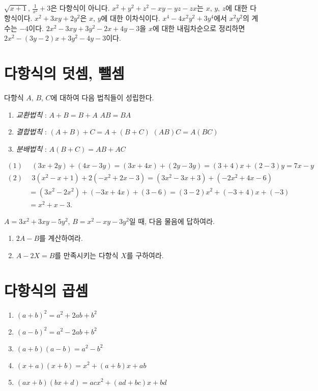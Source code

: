 \documentclass{oblivoir}
\begin{document}
%
\vspace{-20pt}
\tabd
{\(\sqrt{x+1}\), \(\frac1{x^2}+3\)은 다항식이 아니다.}
{\(x^2+y^2+z^2-xy-yz-zx\)는 \(x\), \(y\), \(z\)에 대한 다항식이다.}
{\(x^2+3xy+2y^2\)은 \(x\), \(y\)에 대한 이차식이다.}
{\(x^4-4x^2y^2+3y^4\)에서 \(x^2y^2\)의 계수는 \(-4\)이다.}
{\(2x^2-3xy+3y^2-2x+4y-3\)을 \(x\)에 대한 내림차순으로 정리하면\\ \(2x^2-(3y-2)x+3y^2-4y-3\)이다.}

\section{다항식의 덧셈, 뺄셈}

다항식 \(A\), \(B\), \(C\)에 대하여 다음 법칙들이 성립한다.
\begin{mdframed}
%
\begin{enumerate}
\item
\emph{교환법칙} : \(A+B=B+A\)			\(AB=BA\)
\item
\emph{결합법칙} : \((A+B)+C=A+(B+C)\)	\((AB)C=A(BC)\)
\item
\emph{분배법칙} : \(A(B+C)=AB+AC\)		
\end{enumerate}
\end{mdframed}

%
\exam{}
\vspace{-25pt}
\begin{align*}
(1)&\:\:
(3x+2y)+(4x-3y)
=(3x+4x)+(2y-3y)
=(3+4)x+(2-3)y=7x-y\\
(2)&\:\:
3(x^2-x+1)+2(-x^2+2x-3)
=(3x^2-3x+3)+(-2x^2+4x-6)\\
&=(3x^2-2x^2)+(-3x+4x)+(3-6)
=(3-2)x^2+(-3+4)x+(-3)\\
&=x^2+x-3.
\end{align*}

%
\prob{}
\(A=3x^2+3xy-5y^2\), \(B=x^2-xy-3y^2\)일 때, 다음 물음에 답하여라.
\begin{enumerate}[(1)]
\item
\(2A-B\)를 계산하여라.
\item
\(A-2X=B\)를 만족시키는 다항식 \(X\)를 구하여라.
\end{enumerate}

\section{다항식의 곱셈}

%
\begin{mdframed}
\begin{enumerate}[(1)]
\item
\((a+b)^2=a^2+2ab+b^2\)
\item
\((a-b)^2=a^2-2ab+b^2\)
\item
\((a+b)(a-b)=a^2-b^2\)
\item
\((x+a)(x+b)=x^2+(a+b)x+ab\)
\item
\((ax+b)(bx+d)=acx^2+(ad+bc)x+bd\)
\end{enumerate}
\end{mdframed}
\end{document}
